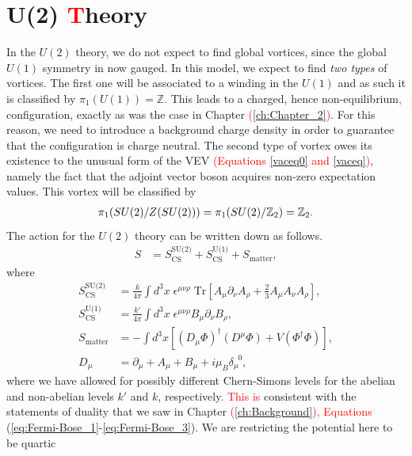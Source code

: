\section{U(2) \textcolor{red}{T}heory}
In the $U(2)$ theory, we do not expect to find global vortices, since the global $U(1)$ symmetry in now gauged. In this model, we expect to find \textit{two types} of vortices. The first one will be associated to a winding in the $U(1)$ and as such it is classified by $\pi_1(U(1))= \mathbb{Z}$. This leads to a charged, hence non-equilibrium\textcolor{red}{,} configuration, exactly as was the case in Chapter \textcolor{red}{(\ref{ch:Chapter_2})}. For this reason, we need to introduce a background charge density in order to guarantee that the configuration is charge neutral. The second type of vortex owes its existence to the unusual form of the VEV \textcolor{red}{(Equations \eqref{vaceq0} and \eqref{vaceq})}, namely the fact that the adjoint vector boson acquires non-zero expectation values. This vortex will be classified by
\begin{align}
    \pi_1(SU(2)/Z(SU(2)))= \pi_1(SU(2)/\mathbb{Z}_2) = \mathbb{Z}_2\textcolor{red}{.} 
\end{align}
The action for the $U(2)$ theory can be written down as follows.    
\begin{align}
    S &= S^{\text{SU(2)}}_{\text{CS}} + S^{\text{U(1)}}_{\text{CS}} + S_{\text{matter}} \label{eq:Action_for_U2_non_abelian_vortices},
\end{align}
where
\begin{align}
    S^{\text{SU(2)}}_{\text{CS}} &= \frac{k}{4 \pi} \int d^3x \; \epsilon^{\mu \nu \rho} \; \mathrm{Tr} \left[A_{\mu} \partial_{\nu}A_{\rho}+ \frac{2}{3} A_{\mu} A_{\nu}A_{\rho} \right], \\
    S^{\text{U(1)}}_{\text{CS}} &= \frac{k'}{4 \pi} \int d^3x \; \epsilon^{\mu \nu \rho} B_{\mu} \partial_{\nu} B_{\rho},\\
    S_{\text{matter}}&= - \int d^3x \left[ \left(D_{\mu} \Phi \right)^{\dag} \left(D^{\mu} \Phi \right) + V\left(\Phi^{\dag}\Phi \right)\right], \\
    D_{\mu} &= \partial_{\mu} + A_{\mu}+B_{\mu} +i \mu_B \delta_{\mu}^{\;\; 0},
\end{align}
where we have allowed for possibly different Chern-Simons levels for the abelian and non-abelian levels $k'$ and $k$, respectively\textcolor{red}{. This is} consistent with the statements of duality that we saw in Chapter \textcolor{red}{(\ref{ch:Background}), Equations} (\ref{eq:Fermi-Bose_1}-\ref{eq:Fermi-Bose_3}). We are restricting the potential  here to be quartic 
